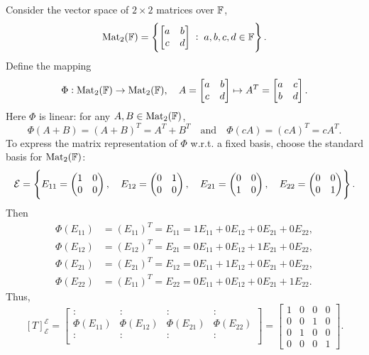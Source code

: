 \documentclass[11pt,openany]{article}
\begin{document}
\newpage
\begin{example*}
Consider the vector space of \(2 \times 2\) matrices over \(\mathbb{F}\),
\[
\operatorname{Mat}_2(\mathbb{F}) = \left\{ \begin{bmatrix} a & b \\ c & d \end{bmatrix} \;:\; a,b,c,d \in \mathbb{F} \right\}.
\]
Define the mapping
\[
\Phi: \operatorname{Mat}_2(\mathbb{F}) \to \operatorname{Mat}_2(\mathbb{F}), \quad A=\begin{bmatrix} a & b \\ c & d \end{bmatrix} \mapsto A^T=\begin{bmatrix} a & c \\ b & d \end{bmatrix}.
\] Here $\Phi$ is linear: for any $A,B\in\text{Mat}_2(\mathbb{F})$,
\[
\Phi(A+B) = (A+B)^T = A^T+B^T \quad\text{and}\quad \Phi(cA) = (cA)^T = cA^T.
\]
To express the matrix representation of \(\Phi\) w.r.t. a fixed basis, choose the standard basis for \(\operatorname{Mat}_2(\mathbb{F})\):
\[\mathcal{E}=\set{
E_{11}=\begin{pmatrix}1&0\\0&0\end{pmatrix},\quad
E_{12}=\begin{pmatrix}0&1\\0&0\end{pmatrix},\quad
E_{21}=\begin{pmatrix}0&0\\1&0\end{pmatrix},\quad
E_{22}=\begin{pmatrix}0&0\\0&1\end{pmatrix}}.
\] Then \begin{align*}
	\Phi(E_{11})&=(E_{11})^T=E_{11}=1E_{11}+0E_{12}+0E_{21}+0E_{22},\\
	\Phi(E_{12})&=(E_{12})^T=E_{21}=0E_{11}+0E_{12}+1E_{21}+0E_{22},\\
	\Phi(E_{21})&=(E_{21})^T=E_{12}=0E_{11}+1E_{12}+0E_{21}+0E_{22},\\
	\Phi(E_{22})&=(E_{11})^T=E_{22}=0E_{11}+0E_{12}+0E_{21}+1E_{22}.
\end{align*} Thus, \[
[T]_{\mathcal{E}}^{\mathcal{E}}=\begin{bmatrix}
	: & : & : & : \\
	\Phi(E_{11}) & \Phi(E_{12}) & \Phi(E_{21}) & \Phi(E_{22}) \\
	: & : & : & : \\
\end{bmatrix}=\begin{bmatrix}
	1 & 0 & 0 & 0 \\
	0 & 0 & 1 & 0 \\
	0 & 1 & 0 & 0 \\
	0 & 0 & 0 & 1
\end{bmatrix}.
\]
\end{example*}
\end{document}
